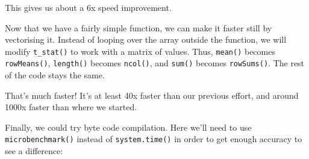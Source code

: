 This gives us about a 6x speed improvement.

Now that we have a fairly simple function, we can make it faster still
by vectorising it. Instead of looping over the array outside the
function, we will modify \texttt{t\_stat()} to work with a matrix of
values. Thus, \texttt{mean()} becomes \texttt{rowMeans()},
\texttt{length()} becomes \texttt{ncol()}, and \texttt{sum()} becomes
\texttt{rowSums()}. The rest of the code stays the same.

\begin{Shaded}
\begin{Highlighting}[]
\StringTok{ }
  \StringTok{ }
    \StringTok{ }
    \StringTok{ }
    \StringTok{ }\StringTok{ }\StringTok{ }\NormalTok{) /}\StringTok{ }\StringTok{ }\NormalTok{)}

    \NormalTok{(}   
  \NormalTok{\}}

  \StringTok{ }\NormalTok{(X[, grp ==}\StringTok{ }\NormalTok{])}
  \StringTok{ }\NormalTok{(X[, grp ==}\StringTok{ }\NormalTok{])}

  \StringTok{ }\StringTok{ }\StringTok{ }\StringTok{ }
  \StringTok{ }\StringTok{ }
\NormalTok{\}}
\StringTok{ }
\NormalTok{(}
\end{Highlighting}
\end{Shaded}

That's much faster! It's at least 40x faster than our previous effort,
and around 1000x faster than where we started.

Finally, we could try byte code compilation. Here we'll need to use
\texttt{microbenchmark()} instead of \texttt{system.time()} in order to
get enough accuracy to see a difference:

